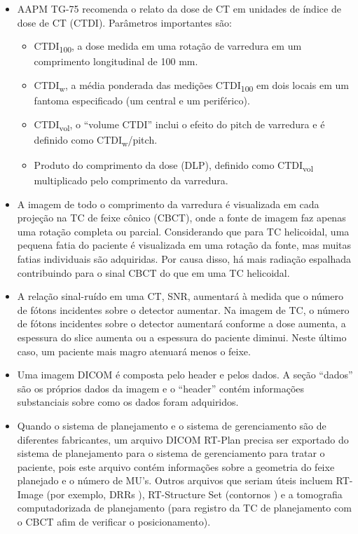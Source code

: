 \documentclass[11pt,a4paper]{article}
\newcounter{exemplo}
\begin{document}
\begin{exemplo}[Imagens]
\begin{itemize}
        \item AAPM TG-75 recomenda o relato da dose de CT em unidades de índice de dose de CT (CTDI). Parâmetros importantes são: 
            \begin{itemize}
                \item CTDI\textsubscript{100}, a dose medida em uma rotação de varredura em um comprimento longitudinal de 100 mm.
                \item CTDI\textsubscript{w}, a média ponderada das medições CTDI\textsubscript{100} em dois locais em um fantoma especificado (um central e um periférico).
                \item CTDI\textsubscript{vol}, o “volume CTDI” inclui o efeito do pitch de varredura e é definido como CTDI\textsubscript{w}/pitch.
                \item Produto do comprimento da dose (DLP), definido como CTDI\textsubscript{vol} multiplicado pelo comprimento da varredura.
            \end{itemize}

        \item A imagem de todo o comprimento da varredura é visualizada em cada projeção na TC de feixe cônico (CBCT), onde a fonte de imagem faz apenas uma rotação completa ou parcial. Considerando que para TC helicoidal, uma pequena fatia do paciente é visualizada em uma rotação da fonte, mas muitas fatias individuais são adquiridas. Por causa disso, há mais radiação espalhada contribuindo para o sinal CBCT do que em uma TC helicoidal.

        \item A relação sinal-ruído em uma CT, SNR, aumentará à medida que o número de fótons incidentes sobre o detector aumentar. Na imagem de TC, o número de fótons incidentes sobre o detector aumentará conforme a dose aumenta, a espessura do slice aumenta ou a espessura do paciente diminui. Neste último caso, um paciente mais magro atenuará menos o feixe.
        
        \item Uma imagem DICOM é composta pelo header e pelos dados. A seção “dados” são os próprios dados da imagem e o “header” contém informações substanciais sobre como os dados foram adquiridos.
        
        \item Quando o sistema de planejamento e o sistema de gerenciamento são de diferentes fabricantes, um arquivo DICOM RT-Plan precisa ser exportado do sistema de planejamento para o sistema de gerenciamento para tratar o paciente, pois este arquivo contém informações sobre a geometria do feixe planejado e o número de MU's. Outros arquivos que seriam úteis incluem RT-Image (por exemplo, DRRs ), RT-Structure Set (contornos ) e a tomografia computadorizada de planejamento (para registro da TC de planejamento com o CBCT afim de verificar o posicionamento).
        

\end{itemize}
\end{exemplo}
\end{document}
